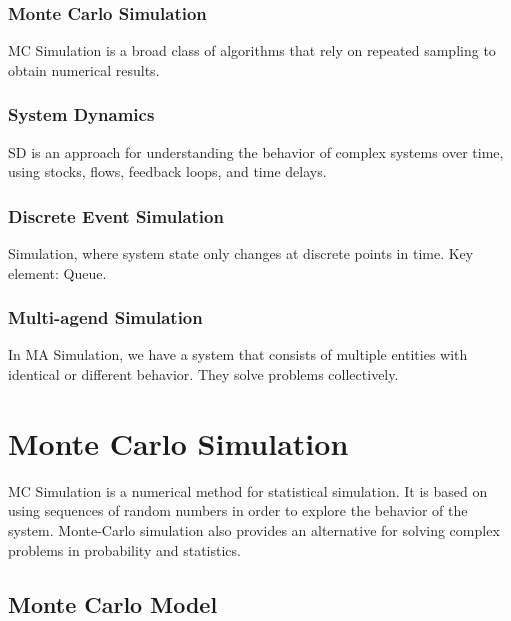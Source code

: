 \hypertarget{monte-carlo-simulation}{%
\subsubsection{Monte Carlo Simulation}\label{monte-carlo-simulation}}

MC Simulation is a broad class of algorithms that rely on repeated
sampling to obtain numerical results.

\hypertarget{system-dynamics}{%
\subsubsection{System Dynamics}\label{system-dynamics}}

SD is an approach for understanding the behavior of complex systems over
time, using stocks, flows, feedback loops, and time delays.

\hypertarget{discrete-event-simulation}{%
\subsubsection{Discrete Event
Simulation}\label{discrete-event-simulation}}

Simulation, where system state only changes at discrete points in time.
Key element: Queue.

\hypertarget{multi-agend-simulation}{%
\subsubsection{Multi-agend Simulation}\label{multi-agend-simulation}}

In MA Simulation, we have a system that consists of multiple entities
with identical or different behavior. They solve problems collectively.

\hypertarget{monte-carlo-simulation-1}{%
\section{Monte Carlo Simulation}\label{monte-carlo-simulation-1}}

MC Simulation is a numerical method for statistical simulation. It is
based on using sequences of random numbers in order to explore the
behavior of the system. Monte-Carlo simulation also provides an
alternative for solving complex problems in probability and statistics.

\hypertarget{monte-carlo-model}{%
\subsection{Monte Carlo Model}\label{monte-carlo-model}}

